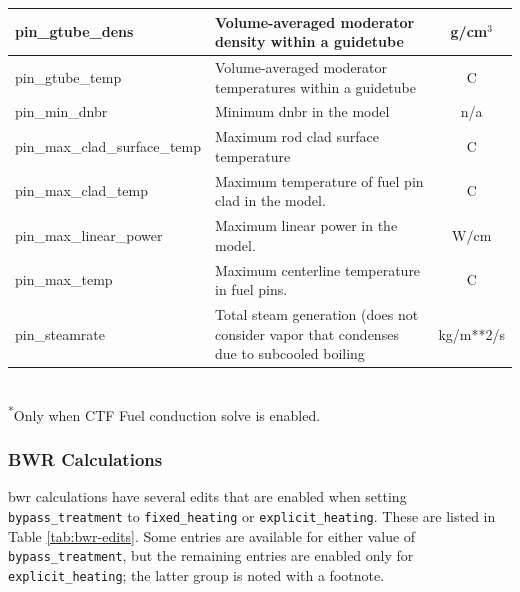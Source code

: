 \begin{table}[h]
\begin{tabular}{|l|p{}|c|}
pin\_gtube\_dens & Volume-averaged moderator density within a guidetube & g/cm$^3$ \\\hline
pin\_gtube\_temp & Volume-averaged moderator temperatures within a guidetube & C \\\hline
pin\_min\_dnbr & Minimum \ac{dnbr} in the model & n/a \\\hline
pin\_max\_clad\_surface\_temp & Maximum rod clad surface temperature & C \\\hline
pin\_max\_clad\_temp & Maximum temperature of fuel pin clad in the model. & C \\\hline
pin\_max\_linear\_power & Maximum linear power in the model. & W/cm \\\hline
pin\_max\_temp & Maximum centerline temperature in fuel pins. & C \\\hline
pin\_steamrate & Total steam generation (does not consider vapor that condenses due to subcooled boiling & kg/m**2/s \\\hline
\end{tabular}
\\
\small\textsuperscript{*}Only when CTF Fuel conduction solve is enabled.
\end{table}

\FloatBarrier

\subsubsection{BWR Calculations}\label{sec:bwr-edits}

\Ac{bwr} calculations have several edits that are enabled when setting \texttt{bypass\_treatment} to \texttt{fixed\_heating} or \texttt{explicit\_heating}.  These are listed in Table \ref{tab:bwr-edits}.  Some entries are available for either value of \texttt{bypass\_treatment}, but the remaining entries are  enabled only for \texttt{explicit\_heating}; the latter group is noted with a footnote.

